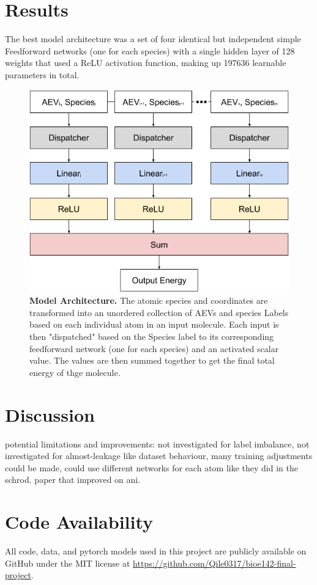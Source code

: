 \documentclass[11pt, twocolumn]{article}
\begin{document}
\section{Results}

The best model architecture was a set of four identical but independent simple Feedforward networks (one for each species) with a single hidden layer of 128 weights that used a ReLU activation function, making up 197636 learnable parameters in total.

\begin{figure}[h]
    \centering
    \includegraphics[width=\columnwidth]{figures/bioe142.png}
    \caption{\textbf{Model Architecture.} The atomic species and coordinates are transformed into an unordered collection of AEVs and species Labels based on each individual atom in an input molecule. Each input is then "dispatched" based on the Species label to its corresponding feedforward network (one for each species) and an activated scalar value. The values are then summed together to get the final total energy of thge molecule.}
    \label{fig:architecture}
\end{figure}

\lipsum[2-4]

\section{Discussion}
\lipsum[5-6]

potential limitations and improvements: not investigated for label imbalance, not investigated for almost-leakage like dataset behaviour, many training adjustments could be made, could use different networks for each atom like they did in the schrod. paper that improved on ani.

\section{Code Availability}

All code, data, and pytorch models used in this project are publicly available on GitHub under the MIT license at \url{https://github.com/Qile0317/bioe142-final-project}.

\printbibliography[heading=bibnumbered]
\end{document}
